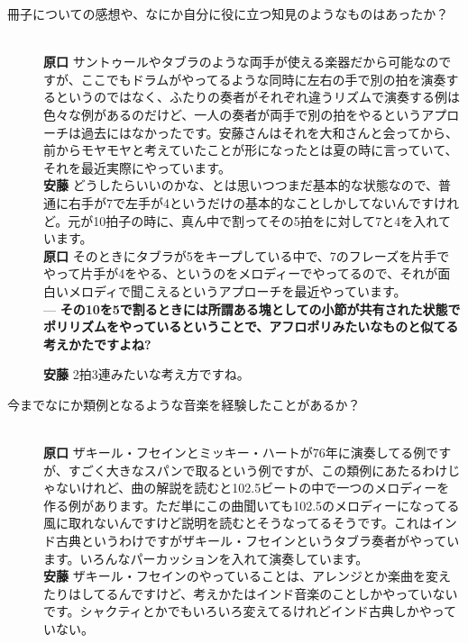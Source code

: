 \documentclass[uplatex,dvipdfmx]{ujarticle}
\begin{document}
\begin{description}
\item [冊子についての感想や、なにか自分に役に立つ知見のようなものはあったか？]\mbox{}\\

{\bf 原口} サントゥールやタブラのような両手が使える楽器だから可能なのですが、ここでもドラムがやってるような同時に左右の手で別の拍を演奏するというのではなく、ふたりの奏者がそれぞれ違うリズムで演奏する例は色々な例があるのだけど、一人の奏者が両手で別の拍をやるというアプローチは過去にはなかったです。安藤さんはそれを大和さんと会ってから、前からモヤモヤと考えていたことが形になったとは夏の時に言っていて、それを最近実際にやっています。\\

{\bf 安藤} どうしたらいいのかな、とは思いつつまだ基本的な状態なので、普通に右手が7で左手が4というだけの基本的なことしかしてないんですけれど。元が10拍子の時に、真ん中で割ってその5拍をに対して7と4を入れています。\\

{\bf 原口} そのときにタブラが5をキープしている中で、7のフレーズを片手でやって片手が4をやる、というのをメロディーでやってるので、それが面白いメロディで聞こえるというアプローチを最近やっています。\\

--- {\bf その10を5で割るときには所謂ある塊としての小節が共有された状態でポリリズムをやっているということで、アフロポリみたいなものと似てる考えかたですよね?}

{\bf 安藤} 2拍3連みたいな考え方ですね。

\item [今までなにか類例となるような音楽を経験したことがあるか？]\mbox{}\\

{\bf 原口} ザキール・フセインとミッキー・ハートが76年に演奏してる例ですが、すごく大きなスパンで取るという例ですが、この類例にあたるわけじゃないけれど、曲の解説を読むと102.5ビートの中で一つのメロディーを作る例があります。ただ単にこの曲聞いても102.5のメロディーになってる風に取れないんですけど説明を読むとそうなってるそうです。これはインド古典というわけですがザキール・フセインというタブラ奏者がやっています。いろんなパーカッションを入れて演奏しています。\\

{\bf 安藤} ザキール・フセインのやっていることは、アレンジとか楽曲を変えたりはしてるんですけど、考えかたはインド音楽のことしかやっていないです。シャクティとかでもいろいろ変えてるけれどインド古典しかやっていない。\\


\end{description}
\end{document}
